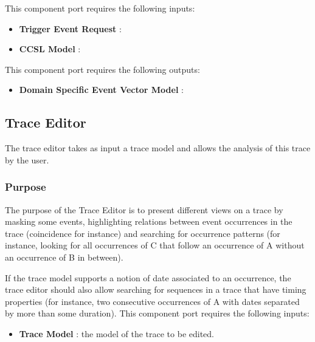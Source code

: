 \documentclass{gemoc} %
\begin{document}
This component port requires the following inputs:
\begin{itemize}
  \item \textbf{Trigger Event Request} :
  \item \textbf{CCSL Model} :
\end{itemize}

This component port requires the following outputs:
\begin{itemize}
  \item \textbf{Domain Specific Event Vector Model} :
\end{itemize}

\subsection{Trace Editor}
The trace editor takes as input a trace model and allows the analysis of this trace by the user.

\subsubsection{Purpose}
The purpose of the Trace Editor is to present different views on a trace by masking some events, highlighting relations between event occurrences in the trace (coincidence for instance) and searching for occurrence patterns (for instance, looking for all occurrences of C that follow an occurrence of A without an occurrence of B in between).

If the trace model supports a notion of date associated to an occurrence, the trace editor should also allow searching for sequences in a trace that have timing properties (for instance, two consecutive occurrences of A with dates separated by more than some duration).
This component port requires the following inputs:
\begin{itemize}
  \item \textbf{Trace Model} :
  the model of the trace to be edited.
\end{itemize}
\end{document}
